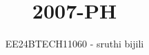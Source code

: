 \documentclass[journal]{IEEEtran}
\begin{document}

\vspace{3cm}

\title{2007-PH}
\author{EE24BTECH11060 - sruthi bijili}
{\let\newpage\relax\maketitle}

\renewcommand{\thefigure}{\theenumi}
\renewcommand{\thetable}{\theenumi}
\setlength{\intextsep}{10pt} %


\renewcommand{\thetable}{\theenumi}
\end{document}
